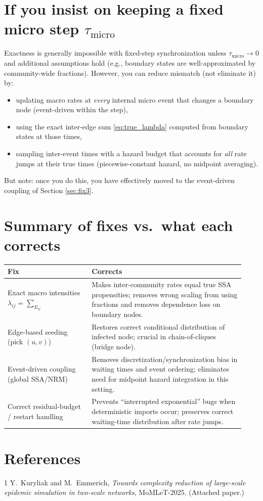 \documentclass[11pt,a4paper]{article}
\begin{document}
\section{If you insist on keeping a fixed micro step $\tau_{\text{micro}}$}

Exactness is generally impossible with fixed-step synchronization unless $\tau_{\text{micro}}\to 0$ and additional
assumptions hold (e.g., boundary states are well-approximated by community-wide fractions). However, you can
reduce mismatch (not eliminate it) by:

\begin{itemize}[leftmargin=*]
\item updating macro rates at \emph{every} internal micro event that changes a boundary node (event-driven within the step),
\item using the exact inter-edge sum \eqref{eq:true_lambda} computed from boundary states at those times,
\item sampling inter-event times with a hazard budget that accounts for \emph{all} rate jumps at their true times
(piecewise-constant hazard, no midpoint averaging).
\end{itemize}

But note: once you do this, you have effectively moved to the event-driven coupling of Section \ref{sec:fix3}.

\section{Summary of fixes vs.\ what each corrects}

\begin{center}
\begin{tabular}{@{}p{0.33\linewidth}p{0.60\linewidth}@{}}
\toprule
\textbf{Fix} & \textbf{Corrects} \\
\midrule
Exact macro intensities $\lambda_{ij}=\sum_{E_{ij}}$ & Makes inter-community rates equal true SSA propensities; removes wrong scaling from using fractions and removes dependence loss on boundary nodes. \\
Edge-based seeding (pick $(u,v)$) & Restores correct conditional distribution of infected node; crucial in chain-of-cliques (bridge node). \\
Event-driven coupling (global SSA/NRM) & Removes discretization/synchronization bias in waiting times and event ordering; eliminates need for midpoint hazard integration in this setting. \\
Correct residual-budget / restart handling & Prevents ``interrupted exponential'' bugs when deterministic imports occur; preserves correct waiting-time distribution after rate jumps. \\
\bottomrule
\end{tabular}
\end{center}

\section*{References}
\begin{thebibliography}{1}
Y.~Kuryliak and M.~Emmerich,
\emph{Towards complexity reduction of large-scale epidemic simulation in two-scale networks},
MoMLeT-2025. (Attached paper.)
\end{thebibliography}
\end{document}
